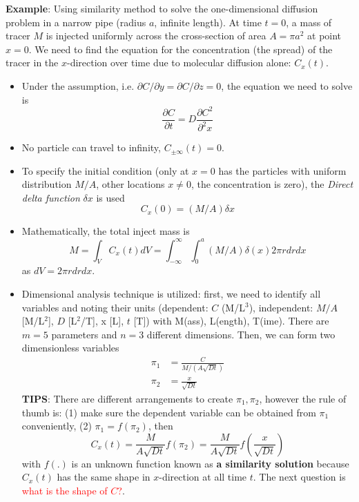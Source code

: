 {\bf Example}: Using similarity method to solve the one-dimensional
diffusion problem in a narrow pipe (radius $a$, infinite length). At
time $t=0$, a mass of tracer $M$ is injected uniformly across the
cross-section of area $A=\pi a^2$ at point $x=0$. We need to find the
equation for the concentration (the spread) of the tracer in the
$x$-direction over time due to molecular diffusion alone: $C_x(t)$.

\begin{itemize}
\item Under the assumption, i.e. $\partial C/\partial y = \partial
  C/\partial z = 0$, the equation we need to solve is
  \begin{equation}
    \label{eq:187}
    \frac{\partial C}{\partial t} = D\frac{\partial C^2}{\partial^2 x}
  \end{equation}

\item No particle can travel to infinity, $C_{\pm\infty}(t)=0$.

\item To specify the initial condition (only at $x=0$ has the
  particles with uniform distribution $M/A$, other locations $x \ne
  0$, the concentration is zero), the {\it Direct delta function} $\delta x$
  is used
  \begin{equation}
    \label{eq:188}
    C_x(0) = (M/A) \delta x
  \end{equation}

\item Mathematically, the total inject mass is
  \begin{equation}
    \label{eq:189}
    M = \int_V C_x(t)dV = \int_{-\infty}^\infty \int_0^a
    (M/A)\delta(x) 2\pi r dr dx
  \end{equation}
as $dV = 2\pi r drdx$.

\item Dimensional analysis technique is utilized: first, we need to
  identify all variables and noting their units (dependent: $C$
  (M/L$^3$), independent: $M/A$ [M/L$^2$], $D$ [L$^2$/T], x [L], $t$
  [T]) with M(ass), L(ength), T(ime). There are $m=5$ parameters and
  $n=3$ different dimensions. Then, we can form two dimensionless
  variables
  \begin{equation}
    \label{eq:191}
    \begin{split}
      \pi_1 &= \frac{C}{M/(A\sqrt{Dt})} \\
      \pi_2 &= \frac{x}{\sqrt{Dt}}
    \end{split}
  \end{equation}
  {\bf TIPS}: There are different arrangements to create $\pi_1, \pi_2$,
  however the rule of thumb is:
  (1) make sure the dependent variable can be obtained from $\pi_1$
  conveniently, (2) $\pi_1 = f(\pi_2)$, then
\begin{equation}
  \label{eq:192}
  C_x(t) = \frac{M}{A\sqrt{Dt}} f(\pi_2) = \frac{M}{A\sqrt{Dt}} f(\frac{x}{\sqrt{Dt}})
\end{equation}
with $f(.)$ is an unknown function known as
{\bf a similarity solution} because $C_x(t)$ has the same shape in
$x$-direction at all time $t$. The next question is
\textcolor{red}{what is the shape of $C$?}.


\end{itemize}
